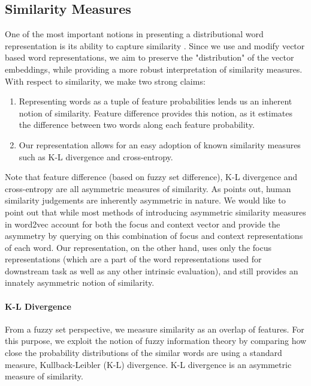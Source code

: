\documentclass[11pt,a4paper]{article}
\begin{document}
\subsection{Similarity Measures}
\label{ssec: similarity math}
One of the most important notions in presenting a distributional word representation is its ability to capture similarity \citep{van2006finding}. Since we use and modify vector based word representations, we aim to preserve the "distribution" of the vector embeddings, while providing a more robust interpretation of similarity measures. With respect to similarity, we make two strong claims:
\begin{enumerate}
    \item Representing words as a tuple of feature probabilities lends us an inherent notion of similarity. Feature difference provides this notion, as it estimates the difference between two words along each feature probability.
    \item Our representation allows for an easy adoption of known similarity measures such as K-L divergence and cross-entropy.
\end{enumerate}

Note that feature difference (based on fuzzy set difference), K-L divergence and cross-entropy are all asymmetric measures of similarity. As \citet{nematzadeh2017evaluating} points out, human similarity judgements are inherently asymmetric in nature. We would like to point out that while most methods of introducing asymmetric similarity measures in word2vec account for both the focus and context vector \citet{asr2018querying} and provide the asymmetry by querying on this combination of focus and context representations of each word. Our representation, on the other hand, uses only the focus representations (which are a part of the word representations used for downstream task as well as any other intrinsic evaluation), and still provides an innately asymmetric notion of similarity.

\paragraph{K-L Divergence} From a fuzzy set perspective, we measure similarity as an overlap of features. For this purpose, we exploit the notion of fuzzy information theory by comparing how close the probability distributions of the similar words are using a standard measure, Kullback-Leibler (K-L) divergence. K-L divergence is an asymmetric measure of similarity. 
\end{document}
